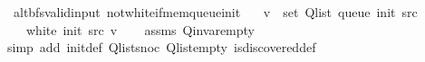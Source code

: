 \begin{isabellebody}
{\isafolddocument}%
%
\isadelimdocument
%
\endisadelimdocument
{}\isamarkupfalse%
\ {\isacharparenleft}{\kern0pt}\ alt{\isacharunderscore}{\kern0pt}bfs{\isacharunderscore}{\kern0pt}valid{\isacharunderscore}{\kern0pt}input{\isacharparenright}{\kern0pt}\ not{\isacharunderscore}{\kern0pt}white{\isacharunderscore}{\kern0pt}if{\isacharunderscore}{\kern0pt}mem{\isacharunderscore}{\kern0pt}queue{\isacharunderscore}{\kern0pt}init{\isacharcolon}{\kern0pt}\isanewline
\ \ \ {\isachardoublequoteopen}v\ {\isasymin}\ set\ {\isacharparenleft}{\kern0pt}Q{\isacharunderscore}{\kern0pt}list\ {\isacharparenleft}{\kern0pt}queue\ {\isacharparenleft}{\kern0pt}init\ src{\isacharparenright}{\kern0pt}{\isacharparenright}{\kern0pt}{\isacharparenright}{\kern0pt}{\isachardoublequoteclose}\isanewline
\ \ \ {\isachardoublequoteopen}{\isasymnot}\ white\ {\isacharparenleft}{\kern0pt}init\ src{\isacharparenright}{\kern0pt}\ v{\isachardoublequoteclose}\isanewline
%
\isadelimproof
\ \ %
\endisadelimproof
%
\isatagproof
{}\isamarkupfalse%
\ assms\ Q{\isachardot}{\kern0pt}invar{\isacharunderscore}{\kern0pt}empty\isanewline
\ \ \isamarkupfalse%
\ {\isacharparenleft}{\kern0pt}simp\ add{\isacharcolon}{\kern0pt}\ init{\isacharunderscore}{\kern0pt}def\ Q{\isachardot}{\kern0pt}list{\isacharunderscore}{\kern0pt}snoc\ Q{\isachardot}{\kern0pt}list{\isacharunderscore}{\kern0pt}empty\ is{\isacharunderscore}{\kern0pt}discovered{\isacharunderscore}{\kern0pt}def{\isacharparenright}{\kern0pt}%
\endisatagproof
{\isafoldproof}%
%
\isadelimproof
%
\endisadelimproof
%
\isadelimdocument
%
\endisadelimdocument
%
\isatagdocument
%

\end{isabellebody}
